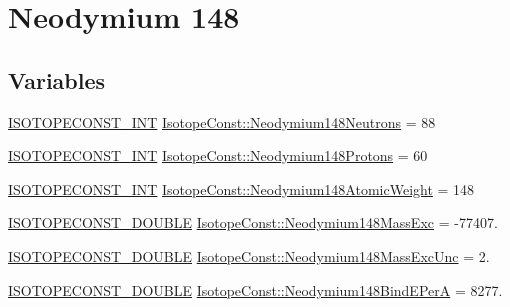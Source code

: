\hypertarget{group___isotope_const-_neodymium-_nd148}{}\section{Neodymium 148}
\label{group___isotope_const-_neodymium-_nd148}
\subsection*{Variables}
\begin{DoxyCompactItemize}
\item 
\mbox{\hyperlink{group___isotope_const-_macros_ga5f18360b3e99483a35c32d789e62621c}{I\+S\+O\+T\+O\+P\+E\+C\+O\+N\+S\+T\+\_\+\+I\+NT}} \mbox{\hyperlink{group___isotope_const-_neodymium-_nd148_ga574db860490ad944e386cb2234237913}{Isotope\+Const\+::\+Neodymium148\+Neutrons}} = 88
\item 
\mbox{\hyperlink{group___isotope_const-_macros_ga5f18360b3e99483a35c32d789e62621c}{I\+S\+O\+T\+O\+P\+E\+C\+O\+N\+S\+T\+\_\+\+I\+NT}} \mbox{\hyperlink{group___isotope_const-_neodymium-_nd148_ga867cd365c1bbd8d660aeb485c409eb47}{Isotope\+Const\+::\+Neodymium148\+Protons}} = 60
\item 
\mbox{\hyperlink{group___isotope_const-_macros_ga5f18360b3e99483a35c32d789e62621c}{I\+S\+O\+T\+O\+P\+E\+C\+O\+N\+S\+T\+\_\+\+I\+NT}} \mbox{\hyperlink{group___isotope_const-_neodymium-_nd148_ga601d4cd9de858d2dbca06efaef4483a8}{Isotope\+Const\+::\+Neodymium148\+Atomic\+Weight}} = 148
\item 
\mbox{\hyperlink{group___isotope_const-_macros_ga8f45a7272ce02c0b4c65c44636ed719a}{I\+S\+O\+T\+O\+P\+E\+C\+O\+N\+S\+T\+\_\+\+D\+O\+U\+B\+LE}} \mbox{\hyperlink{group___isotope_const-_neodymium-_nd148_ga5c9dae49e04595b390e6eb4a79f4a880}{Isotope\+Const\+::\+Neodymium148\+Mass\+Exc}} = -\/77407.
\item 
\mbox{\hyperlink{group___isotope_const-_macros_ga8f45a7272ce02c0b4c65c44636ed719a}{I\+S\+O\+T\+O\+P\+E\+C\+O\+N\+S\+T\+\_\+\+D\+O\+U\+B\+LE}} \mbox{\hyperlink{group___isotope_const-_neodymium-_nd148_ga1fc357a80582fb44183d4d41d09c78c9}{Isotope\+Const\+::\+Neodymium148\+Mass\+Exc\+Unc}} = 2.
\item 
\mbox{\hyperlink{group___isotope_const-_macros_ga8f45a7272ce02c0b4c65c44636ed719a}{I\+S\+O\+T\+O\+P\+E\+C\+O\+N\+S\+T\+\_\+\+D\+O\+U\+B\+LE}} \mbox{\hyperlink{group___isotope_const-_neodymium-_nd148_ga423b44a614b7a32c6ab25117c6dd50a7}{Isotope\+Const\+::\+Neodymium148\+Bind\+E\+PerA}} = 8277.
\item 

\end{DoxyCompactItemize}
